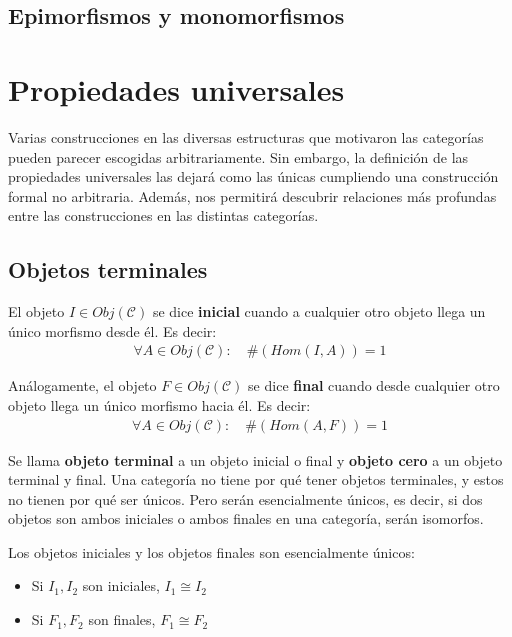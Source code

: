 \documentclass[a4paper, 11pt]{amsart}
\newcommand{\C}{\mathcal{C} }
\theoremstyle{definition}
\theoremstyle{remark}
\numberwithin{equation}{section}
\begin{document}
  \subsection {Epimorfismos y monomorfismos}

\newpage
\section {Propiedades universales}
  Varias construcciones en las diversas estructuras que motivaron las categorías pueden parecer
  escogidas arbitrariamente. Sin embargo, la definición de las propiedades universales las dejará
  como las únicas cumpliendo una construcción formal no arbitraria. Además, nos permitirá descubrir
  relaciones más profundas entre las construcciones en las distintas categorías.
  
  \subsection {Objetos terminales}
     El objeto $I \in Obj(\C)$ se dice \textbf{inicial} cuando a cualquier otro objeto llega
    un único morfismo desde él. Es decir:
    \begin{gather*}
      \forall A \in Obj(\C):\quad \#(Hom(I,A)) = 1
    \end{gather*}

     Análogamente, el objeto $F \in Obj(\C)$ se dice \textbf{final} cuando desde cualquier otro objeto llega
    un único morfismo hacia él. Es decir:
    \begin{gather*}
      \forall A \in Obj(\C):\quad \#(Hom(A,F)) = 1
    \end{gather*}
    
    Se llama \textbf{objeto terminal} a un objeto inicial o final y \textbf{objeto cero} a un objeto
    terminal y final. Una categoría no tiene por qué
    tener objetos terminales, y estos no tienen por qué ser únicos. Pero serán esencialmente únicos,
    es decir, si dos objetos son ambos iniciales o ambos finales en una categoría, serán isomorfos.
    
    \theorem Los objetos iniciales y los objetos finales son esencialmente únicos:
    \begin{itemize}
     \item Si $I_1,I_2$ son iniciales, $I_1 \cong I_2$
     \item Si $F_1,F_2$ son finales, $F_1 \cong F_2$
    \end{itemize}
\end{document}
